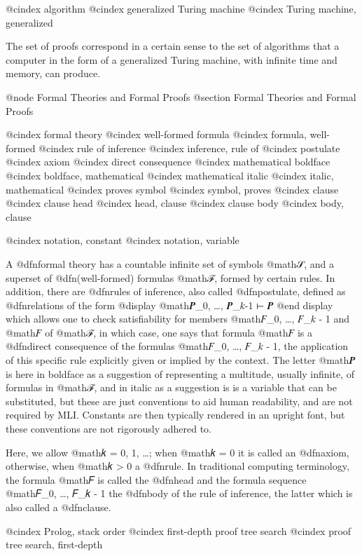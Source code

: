 @cindex algorithm
@cindex generalized Turing machine
@cindex Turing machine, generalized

The set of proofs correspond in a certain sense to the set of algorithms that a computer in the form of a generalized Turing machine, with infinite time and memory, can produce.


@node Formal Theories and Formal Proofs
@section Formal Theories and Formal Proofs

@cindex formal theory
@cindex well-formed formula
@cindex formula, well-formed
@cindex rule of inference
@cindex inference, rule of
@cindex postulate
@cindex axiom
@cindex direct consequence
@cindex mathematical boldface
@cindex boldface, mathematical
@cindex mathematical italic
@cindex italic, mathematical
@cindex proves symbol
@cindex symbol, proves
@cindex clause
@cindex clause head
@cindex head, clause
@cindex clause body
@cindex body, clause

@cindex notation, constant
@cindex notation, variable


A @dfn{formal theory} has a countable infinite set of symbols @math{𝒮}, and a superset of @dfn{(well-formed) formulas} @math{ℱ}, formed by certain rules. In addition, there are @dfn{rules of inference}, also called @dfn{postulate}, defined as @dfn{relations} of the form
@display
@math{𝑷_0, …, 𝑷_{𝑘-1} ⊢ 𝑷}
@end display
which allows one to check satisfiability for members @math{𝐹_0, …, 𝐹_{𝑘 - 1}} and @math{𝐹} of @math{ℱ}, in which case, one says that formula @math{𝐹} is a @dfn{direct consequence} of the formulas @math{𝐹_0, …, 𝐹_{𝑘 - 1}}, the application of this specific rule explicitly given or implied by the context. The letter @math{𝑷} is here in boldface as a suggestion of representing a multitude, usually infinite, of formulas in @math{ℱ}, and in italic as a suggestion is is a variable that can be substituted, but these are just conventions to aid human readability, and are not required by MLI. Constants are then typically rendered in an upright font, but these conventions are not rigorously adhered to.

Here, we allow @math{𝑘 = 0, 1, …}; when @math{𝑘 = 0} it is called an @dfn{axiom}, otherwise, when @math{𝑘 > 0} a @dfn{rule}. In traditional computing terminology, the formula @math{𝐹} is called the @dfn{head} and the formula sequence @math{𝐹_0, …, 𝐹_{𝑘 - 1}} the @dfn{body} of the rule of inference, the latter which is also called a @dfn{clause}.


@cindex Prolog, stack order
@cindex first-depth proof tree search
@cindex proof tree search, first-depth


